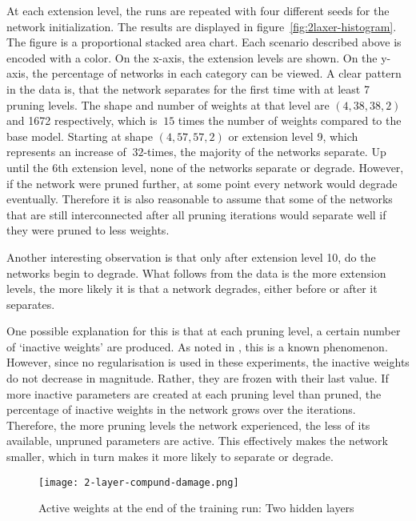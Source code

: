 At each extension level, the runs are repeated with four different seeds for the network initialization.
The results are displayed in figure~\ref{fig:2laxer-histogram}.
The figure is a proportional stacked area chart.
Each scenario described above is encoded with a color.
On the x-axis, the extension levels are shown.
On the y-axis, the percentage of networks in each category can be viewed.
A clear pattern in the data is, that the network separates for the first time with at least 7 pruning levels.
The shape and number of weights at that level are $(4,38,38,2)$ and 1672 respectively, which is $~15$ times the number of weights compared to the base model. 
Starting at shape $(4,57,57,2)$ or extension level 9, which represents an increase of $~32$-times, the majority of the networks separate.
Up until the 6th extension level, none of the networks separate or degrade. 
However, if the network were pruned further, at some point every network would degrade eventually.
Therefore it is also reasonable to assume that some of the networks that are still interconnected after all pruning iterations would separate well if they were pruned to less weights.

Another interesting observation is that only after extension level 10, do the networks begin to degrade.
What follows from the data is the more extension levels, the more likely it is that a network degrades, either before or after it separates.

One possible explanation for this is that at each pruning level, a certain number of `inactive weights' are produced.
As noted in \autocite{HanEtAl15, AllAlivePruning}, this is a known phenomenon.
However, since no regularisation is used in these experiments, the inactive weights do not decrease in magnitude.
Rather, they are frozen with their last value.
If more inactive parameters are created at each pruning level than pruned, the percentage of inactive weights in the network grows over the iterations.
Therefore, the more pruning levels the network experienced, the less of its available, unpruned parameters are active.
This effectively makes the network smaller, which in turn makes it more likely to separate or degrade.

\begin{figure}[ht]
    \centering
    \texttt{[image: 2-layer-compund-damage.png]}
    \caption{
        Active weights at the end of the training run: Two hidden layers
    }\label{fig:collateral_damage}
\end{figure}

